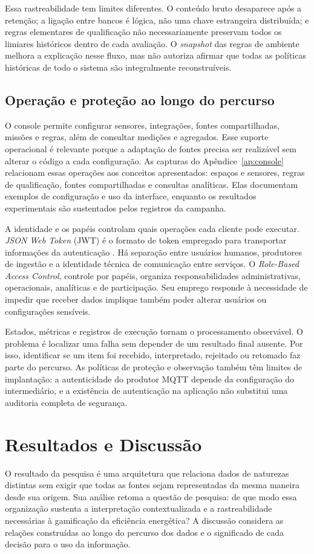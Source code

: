 \documentclass[tcc,capa]{texufpel}
\begin{document}
Essa rastreabilidade tem limites diferentes. O conteúdo bruto desaparece após a retenção; a ligação entre bancos é lógica, não uma chave estrangeira distribuída; e regras elementares de qualificação não necessariamente preservam todos os limiares históricos dentro de cada avaliação. O \emph{snapshot} das regras de ambiente melhora a explicação nesse fluxo, mas não autoriza afirmar que todas as políticas históricas de todo o sistema são integralmente reconstruíveis.

\section{Operação e proteção ao longo do percurso}
O console permite configurar sensores, integrações, fontes compartilhadas, missões e regras, além de consultar medições e agregados. Esse suporte operacional é relevante porque a adaptação de fontes precisa ser realizável sem alterar o código a cada configuração. As capturas do Apêndice~\ref{ap:console} relacionam essas operações aos conceitos apresentados: espaços e sensores, regras de qualificação, fontes compartilhadas e consultas analíticas. Elas documentam exemplos de configuração e uso da interface, enquanto os resultados experimentais são sustentados pelos registros da campanha.

A identidade e os papéis controlam quais operações cada cliente pode executar. \emph{JSON Web Token} (JWT) é o formato de token empregado para transportar informações da autenticação \cite{jwt2015}. Há separação entre usuários humanos, produtores de ingestão e a identidade técnica de comunicação entre serviços. O \emph{Role-Based Access Control}, controle por papéis, organiza responsabilidades administrativas, operacionais, analíticas e de participação. Seu emprego responde à necessidade de impedir que receber dados implique também poder alterar usuários ou configurações sensíveis.

Estados, métricas e registros de execução tornam o processamento observável. O problema é localizar uma falha sem depender de um resultado final ausente. Por isso, identificar se um item foi recebido, interpretado, rejeitado ou retomado faz parte do percurso. As políticas de proteção e observação também têm limites de implantação: a autenticidade do produtor MQTT depende da configuração do intermediário, e a existência de autenticação na aplicação não substitui uma auditoria completa de segurança.

\chapter{Resultados e Discussão}\label{cap:avaliacao}
O resultado da pesquisa é uma arquitetura que relaciona dados de naturezas distintas sem exigir que todas as fontes sejam representadas da mesma maneira desde sua origem. Sua análise retoma a questão de pesquisa: de que modo essa organização sustenta a interpretação contextualizada e a rastreabilidade necessárias à gamificação da eficiência energética? A discussão considera as relações construídas ao longo do percurso dos dados e o significado de cada decisão para o uso da informação.
\end{document}
